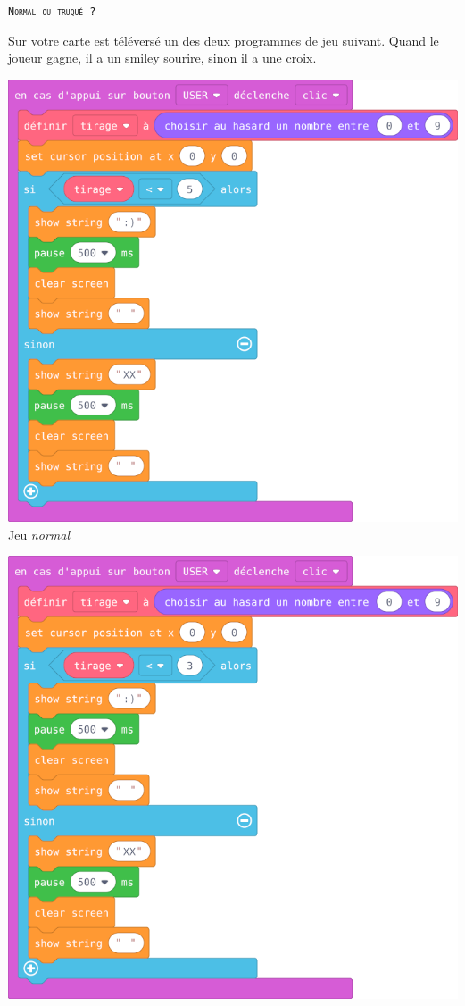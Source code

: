 \begin{eleve}    
    \texttt{\textsc{Normal ou truqué ?}}
    
    Sur votre carte est téléversé un des deux programmes de jeu suivant. Quand le joueur gagne, il a un smiley sourire, sinon il a  une croix. 
    
    
    
\begin{minipage}[t]{0.5\linewidth}
    \begin{center}
        \vspace{0cm}
        \includegraphics[width=0.9\linewidth]{res/st-normal.png}\\
        Jeu \emph{normal}
    \end{center}
\end{minipage}
\hfill
\begin{minipage}[t]{0.5\linewidth}
    \begin{center}
        \vspace{0cm}
        \includegraphics[width=0.9\linewidth]{res/st-truque.png}\\

\end{center}
\end{minipage}
\end{eleve}

